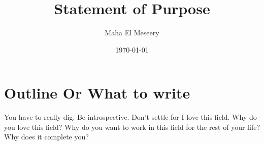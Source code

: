 \documentclass[a4paper,12pt]{article}%
\begin{document}
\title{Statement of Purpose}
\author{Maha El Meseery }
 
\date{\today}
 
\maketitle 

%

\section{Outline Or What to write}
You have to really dig. Be introspective. Don't settle for I love this field. Why do you love this field? Why do you want to work in this field for the rest of your life? Why does it complete you?
 
\end{document}
